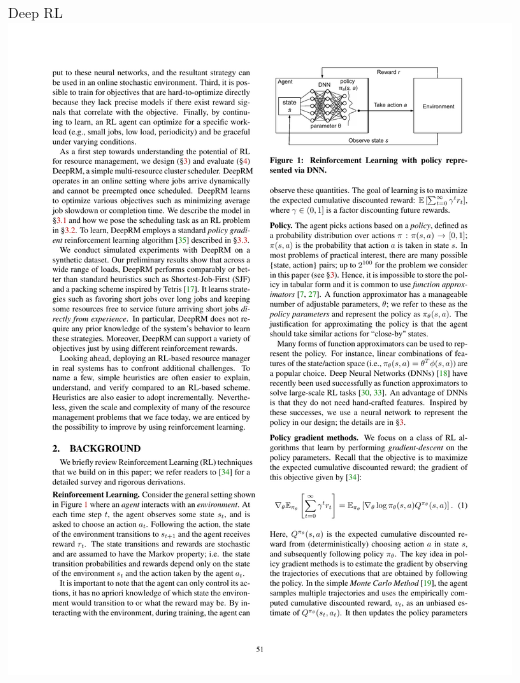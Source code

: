\documentclass[]{beamer}
\begin{document}
\begin{frame}{Deep RL}
    \centering
    \includegraphics[width=\textwidth]{assets/slides/drl.pdf}
\end{frame}
\end{document}
